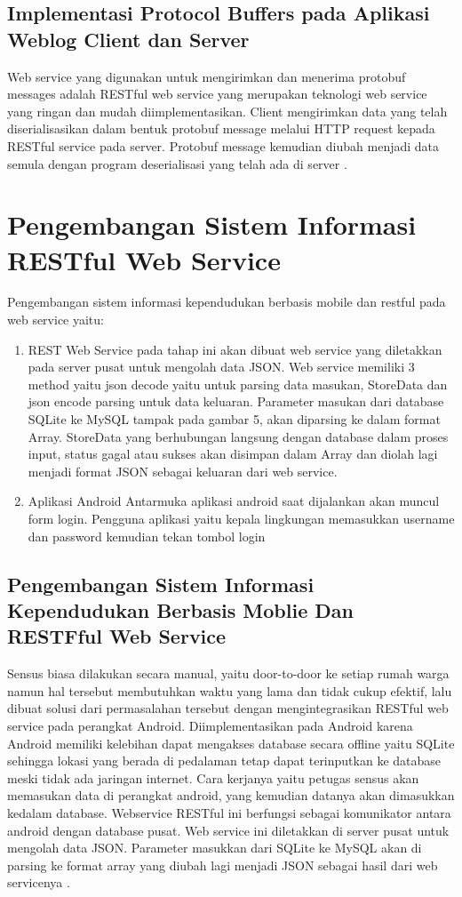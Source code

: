 \subsection{Implementasi Protocol Buffers pada Aplikasi Weblog Client dan Server}
Web service yang digunakan untuk mengirimkan dan menerima   protobuf  messages adalah  RESTful  web service  yang  merupakan  teknologi  web  service  yang ringan dan mudah diimplementasikan. Client mengirimkan data yang telah diserialisasikan dalam bentuk protobuf message melalui  HTTP  request kepada RESTful  service pada server. Protobuf  message kemudian diubah menjadi data semula dengan program deserialisasi yang telah ada di server \cite{wibowo2011implementasi}.

\section{Pengembangan Sistem Informasi RESTful Web Service}
Pengembangan sistem informasi kependudukan berbasis mobile dan restful pada web service yaitu\cite{kurniawati2016pengembangan}:
\begin{enumerate}
\item REST Web Service pada tahap ini akan dibuat web service yang diletakkan pada server pusat untuk mengolah data JSON. Web service memiliki 3 method yaitu json decode yaitu untuk parsing data masukan, StoreData dan json encode parsing untuk data keluaran. Parameter masukan dari database SQLite ke MySQL tampak pada gambar 5, akan diparsing ke dalam format Array. StoreData yang berhubungan langsung dengan database dalam proses input, status gagal atau sukses akan disimpan dalam Array dan diolah lagi menjadi format JSON sebagai keluaran dari web service.
\item Aplikasi Android Antarmuka aplikasi android saat dijalankan akan muncul form login. Pengguna aplikasi yaitu kepala lingkungan memasukkan username dan password kemudian tekan tombol login
\end{enumerate}

\subsection{Pengembangan Sistem Informasi Kependudukan Berbasis Moblie Dan RESTFful Web Service}
Sensus biasa dilakukan secara manual, yaitu door-to-door ke setiap rumah warga namun hal tersebut membutuhkan waktu yang lama dan tidak cukup efektif, lalu dibuat solusi dari permasalahan tersebut dengan mengintegrasikan RESTful web service pada perangkat Android. Diimplementasikan pada Android karena Android memiliki kelebihan dapat mengakses database secara offline yaitu SQLite sehingga lokasi yang berada di pedalaman tetap dapat terinputkan ke database meski tidak ada jaringan internet.
Cara kerjanya yaitu petugas sensus akan memasukan data di perangkat android, yang kemudian datanya akan dimasukkan kedalam database. Webservice RESTful ini berfungsi sebagai komunikator antara android dengan database pusat. Web service ini diletakkan di server pusat untuk mengolah data JSON. Parameter masukkan dari SQLite ke MySQL akan di parsing ke format array yang diubah lagi menjadi JSON sebagai hasil dari web servicenya \cite{kurniawati2016pengembangan}.

